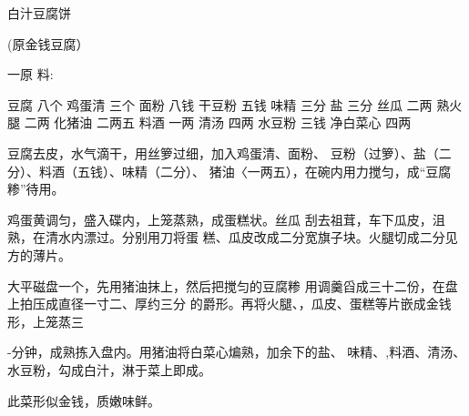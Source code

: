 \begin{recipe}{白汁豆腐饼}

(原金钱豆腐）

一原 料:

豆腐	八个	鸡蛋清	三个
面粉	八钱	干豆粉	五钱
味精	三分	盐	三分
丝瓜	二两	熟火腿	二两
化猪油	二两五	料酒	一两
清汤	四两	水豆粉	三钱
净白菜心	四两

\cooking

\step 	豆腐去皮，水气滴干，用丝箩过细，加入鸡蛋清、面粉、 豆粉（过箩）、盐（二分）、料酒（五钱）、味精（二分）、 猪油〈一两五），在碗内用力搅匀，成“豆腐糁”待用。

\step 	鸡蛋黄调匀，盛入碟内，上笼蒸熟，成蛋糕状。丝瓜 刮去祖茸，车下瓜皮，沮熟，在清水内漂过。分别用刀将蛋 糕、瓜皮改成二分宽旗子块。火腿切成二分见方的薄片。

\step 	大平磁盘一个，先用猪油抹上，然后把搅匀的豆腐糁 用调羹舀成三十二份，在盘上拍压成直径一寸二、厚约三分 的爵形。再将火腿、，瓜皮、蛋糕等片嵌成金钱形，上笼蒸三

-分钟，成熟拣入盘内。用猪油将白菜心煸熟，加余下的盐、 味精、,料酒、清汤、水豆粉，勾成白汁，淋于菜上即成。

\notes

此菜形似金钱，质嫩味鲜。

\end{recipe}

